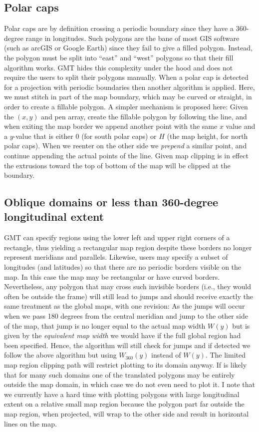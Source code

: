 \documentclass[12pt,letterpaper,margin=0.5in]{article}
\begin{document}
\subsection{Polar caps}
Polar caps are by definition crossing a periodic boundary since they have a 360-degree range in longitudes.  Such polygons are the
bane of most GIS software (such as arcGIS or Google Earth) since they fail to give a filled polygon.  Instead, the polygon must be split into
``east'' and ``west'' polygons so that their fill algorithm works.  GMT hides this complexity under the hood and does not require the users to
split their polygons manually.  When a polar cap is detected for a projection with periodic boundaries then another algorithm is applied.  Here,
we must stitch in part of the map boundary, which may be curved or straight, in order to create a fillable polygon.  A simpler mechanism is proposed here:
Given the $(x,y)$ and pen array, create the fillable polygon by following the line, and when exiting the map border we append another point with
the same $x$ value and a $y$-value that is either 0 (for south polar caps) or $H$ (the map height, for north polar caps). When we reenter on the
other side we \emph{prepend} a similar point, and continue appending the actual points of the line.  Given map clipping is in effect the extrusions
toward the top of bottom of the map will be clipped at the boundary.

\subsection{Oblique domains or less than 360-degree longitudinal extent}
GMT can specify regions using the lower left and upper right corners of a rectangle, thus yielding a rectangular map region despite these
borders no longer represent meridians and parallels.  Likewise, users may specify a subset of longitudes (and latitudes) so that there are
no periodic borders visible on the map.  In this case the map may be rectangular or have curved borders.  Nevertheless, any polygon that
may cross such invisible borders (i.e., they would often be outside the frame)
will still lead to jumps and should receive exactly the same treatment as the global maps, with one revision:  As the jumps will occur when we
pass 180 degrees from the central meridian and jump to the other side of the map, that jump is no longer equal to the actual map width $W(y)$ but is given by the
\emph{equivalent map width} we would have if the full global region had been specified.  Hence, the algorithm will still check for jumps and if detected we follow
the above algorithm but using $W_{360}(y)$ instead of $W(y)$.  The limited map region clipping path will restrict plotting to its domain anyway.
If is likely that for many such domains one of the translated polygons may be entirely outside the map domain, in which case we do not even need to
plot it.  I note that we currently have a hard time with plotting polygons with large longitudinal extent on a relative small map region because the
polygon part far outside the map region, when projected, will wrap to the other side and result in horizontal lines on the map.
\end{document}
